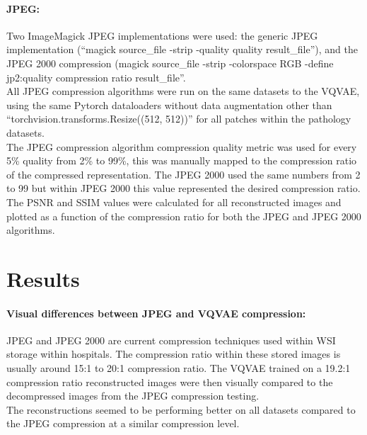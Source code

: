 \documentclass[review]{elsarticle}
\begin{document}
\paragraph{JPEG:} Two ImageMagick JPEG implementations were used: the generic JPEG implementation (“magick {source_file} -strip -quality {quality} {result_file}”), 
 and the JPEG 2000 compression (magick {source_file} -strip -colorspace RGB -define jp2:quality {compression ratio} {result_file}”. \\
 All JPEG compression algorithms were run on the same datasets to the VQVAE, using the same Pytorch dataloaders without data augmentation other than “torchvision.transforms.Resize((512, 512))” for all patches within the pathology datasets. \\
 The JPEG compression algorithm compression quality metric was used for every 5\% quality from 2\% to 99\%, this was manually mapped to the compression ratio of the compressed representation. The JPEG 2000 used the same numbers from 2 to 99 but within JPEG 2000 this value represented the desired compression ratio. The PSNR and SSIM values were calculated for all reconstructed images and plotted as a function of the compression ratio for both the JPEG and JPEG 2000 algorithms.

\section{Results}
\paragraph{Visual differences between JPEG and VQVAE compression:} JPEG and JPEG 2000 are current compression techniques used within WSI storage within hospitals. The compression ratio within these stored images is usually around 15:1 to 20:1 compression ratio. The VQVAE trained on a 19.2:1 compression ratio reconstructed images were then visually compared to the decompressed images from the JPEG compression testing. \\
The reconstructions seemed to be performing better on all datasets compared to the JPEG compression at a similar compression level. \\
\end{document}
